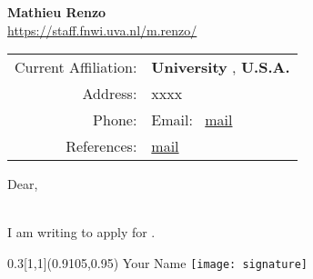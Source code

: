 \documentclass[11pt,letter]{article}
\newcounter{TODOLIST}
\begin{document}
\begin{center}
{\LARGE \bf Mathieu Renzo}\\
\vspace{0.1cm}
{
  \footnotesize
 \href{https://staff.fnwi.uva.nl/m.renzo/}{https://staff.fnwi.uva.nl/m.renzo/} \\
}
\begin{tabular}[ht]{rl}
  Current Affiliation: & {\bf University }, {\bf U.S.A.}  \\
  Address: & xxxx\\
  Phone: &    \qquad \qquad Email: \
           \href{mailto:}{mail}\\
References: & \href{mailto:}{mail}

\end{tabular}
\end{center}
\hrulefill

\vspace{0.1cm}

Dear,\\\

I am writing to apply for .






   \begin{textblock}{0.3}[1,1](0.9105,0.95)
     \centering
     Your Name
     \texttt{[image: signature]}
   \end{textblock}



\end{document}
